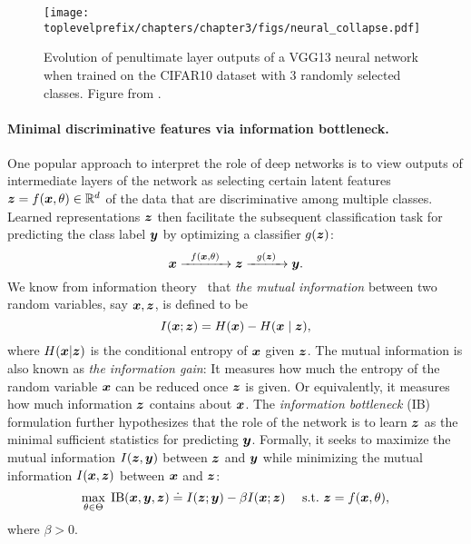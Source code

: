 \documentclass[../../book-main.tex]{subfiles}
\begin{document}
\begin{figure}
	\centering
	\texttt{[image: \\toplevelprefix/chapters/chapter3/figs/neural\_collapse.pdf]}
	\caption{Evolution of penultimate layer outputs of a VGG13 neural network when trained on the CIFAR10 dataset with 3 randomly selected classes. Figure from \cite{papyan2020prevalence}.}
	\label{chap4-fig:neural-collapse}
\end{figure}

\paragraph{Minimal discriminative features via information bottleneck.}
One popular approach to interpret the role of deep networks is to view outputs of intermediate layers of the network as selecting certain latent features $\bm{z} = f(\bm{x}, \theta) \in \mathbb{R}^d$ of the data that are discriminative among multiple classes. Learned representations $\bm{z}$ then  facilitate the subsequent classification task for predicting the class label $\bm{y}$ by optimizing a classifier $g(\bm{z})$:
\begin{equation}
	\bm{x}   \xrightarrow{\hspace{2mm} f(\bm{x}, \theta)\hspace{2mm}} \bm{z}  \xrightarrow{\hspace{2mm} g(\bm{z}) \hspace{2mm}} \bm{y}.
\end{equation}
We know from information theory~\cite{Cover-Thomas} that {\em the mutual information} between two random variables, say $\bm{x},\bm{z}$, is defined to be
\begin{equation}
	I(\bm{x}; \bm{z}) = H(\bm{x}) - H(\bm{x}\mid \bm{z}),
\end{equation}
where $H(\bm{x} \vert \bm{z})$ is the conditional entropy of $\bm{x}$ given $\bm{z}$. The mutual information is also known as {\em the information gain}: It measures how much the entropy of the random variable $\bm{x}$ can be reduced once $\bm{z}$ is given. Or equivalently, it measures how much information $\bm{z}$ contains about $\bm{x}$.  The {\em information bottleneck} (IB) formulation \cite{Tishby-ITW2015} further hypothesizes that the role of the network is to learn $\bm{z}$ as the minimal sufficient statistics for predicting $\bm{y}$. Formally, it seeks to maximize the mutual information $I(\bm{z}, \bm{y})$
between $\bm{z}$ and $\bm{y}$ while minimizing the mutual information $I(\bm{x}, \bm{z})$ between $\bm{x}$ and $\bm{z}$:
\begin{equation}
	\max_{\theta\in \Theta}\; \mbox{IB}(\bm{x}, \bm{y}, \bm{z}) \doteq I(\bm{z}; \bm{y}) - \beta I(\bm{x}; \bm{z}) \quad\ \mathrm{s.t.}\ \bm{z} = f(\bm{x}, \theta),
	\label{chap4-eqn:information-bottleneck}
\end{equation}
where $\beta >0$. 
\end{document}
